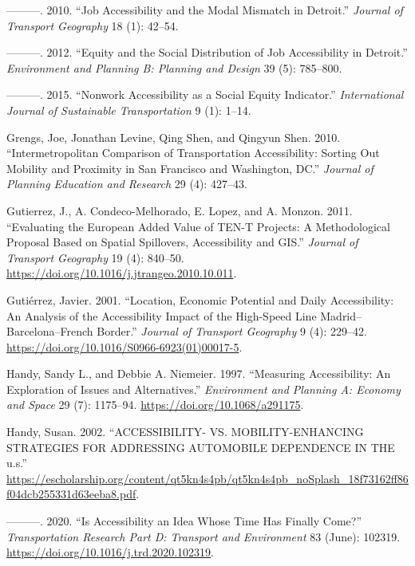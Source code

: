 \documentclass[
]{article}
\newlength{\cslhangindent}
\newenvironment{CSLReferences}[2] %
 {\begin{list}{}{%
  \setlength{\itemindent}{0pt}
  \setlength{\leftmargin}{0pt}
  \setlength{\parsep}{0pt}
  \ifodd #1
   \setlength{\leftmargin}{\cslhangindent}
   \setlength{\itemindent}{-1\cslhangindent}
  \fi
  \setlength{\itemsep}{#2\baselineskip}}}
 {\end{list}}
\begin{document}
\begin{CSLReferences}{1}{0}
---------. 2010. {``Job Accessibility and the Modal Mismatch in
Detroit.''} \emph{Journal of Transport Geography} 18 (1): 42--54.

---------. 2012. {``Equity and the Social Distribution of Job
Accessibility in Detroit.''} \emph{Environment and Planning B: Planning
and Design} 39 (5): 785--800.

---------. 2015. {``Nonwork Accessibility as a Social Equity
Indicator.''} \emph{International Journal of Sustainable Transportation}
9 (1): 1--14.

Grengs, Joe, Jonathan Levine, Qing Shen, and Qingyun Shen. 2010.
{``Intermetropolitan Comparison of Transportation Accessibility: Sorting
Out Mobility and Proximity in San Francisco and Washington, DC.''}
\emph{Journal of Planning Education and Research} 29 (4): 427--43.

Gutierrez, J., A. Condeco-Melhorado, E. Lopez, and A. Monzon. 2011.
{``Evaluating the {European} Added Value of {TEN}-{T} Projects: A
Methodological Proposal Based on Spatial Spillovers, Accessibility and
{GIS}.''} \emph{Journal of Transport Geography} 19 (4): 840--50.
\url{https://doi.org/10.1016/j.jtrangeo.2010.10.011}.

Gutiérrez, Javier. 2001. {``Location, Economic Potential and Daily
Accessibility: An Analysis of the Accessibility Impact of the High-Speed
Line Madrid--Barcelona--French Border.''} \emph{Journal of Transport
Geography} 9 (4): 229--42.
\url{https://doi.org/10.1016/S0966-6923(01)00017-5}.

Handy, Sandy L., and Debbie A. Niemeier. 1997. {``Measuring
Accessibility: An Exploration of Issues and Alternatives.''}
\emph{Environment and Planning A: Economy and Space} 29 (7): 1175--94.
\url{https://doi.org/10.1068/a291175}.

Handy, Susan. 2002. {``{ACCESSIBILITY}- {VS}. {MOBILITY}-{ENHANCING}
{STRATEGIES} {FOR} {ADDRESSING} {AUTOMOBILE} {DEPENDENCE} {IN} {THE}
u.s.''}
\url{https://escholarship.org/content/qt5kn4s4pb/qt5kn4s4pb_noSplash_18f73162ff86f04dcb255331d63eeba8.pdf}.

---------. 2020. {``Is Accessibility an Idea Whose Time Has Finally
Come?''} \emph{Transportation Research Part D: Transport and
Environment} 83 (June): 102319.
\url{https://doi.org/10.1016/j.trd.2020.102319}.


\end{CSLReferences}
\end{document}
